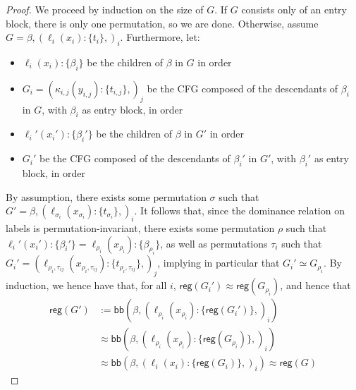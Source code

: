 \documentclass[acmsmall,screen,review]{acmart}
\newcommand{\ms}[1]{\ensuremath{\mathsf{#1}}}
\newcommand{\lto}{:}
\newcommand{\wbranch}[3]{#1(#2) \lto \{#3\}}
\newcommand{\teqv}{\approx}
\newcommand{\adddom}[2]{\ms{bb}(#1, #2)}
\newcommand{\toreg}[1]{\ms{reg}(#1)}
\begin{document}
\cfgperminvar*

\label{proof:cfg-perm-invar}

\begin{proof}
  We proceed by induction on the size of $G$. If $G$ consists only of an entry block, there is only
  one permutation, so we are done. Otherwise, assume $G = \beta, (\wbranch{\ell_i}{x_i}{t_i},)_i$.
  Furthermore, let:
  \begin{itemize}
    \item $\wbranch{\ell_i}{x_i}{\beta_i}$ be the children of $\beta$ in $G$ in order
    \item $G_i = (\wbranch{\kappa_{i, j}}{y_{i, j}}{t_{i, j}},)_j$ be the CFG composed of the
    descendants of $\beta_i$ in $G$, with $\beta_i$ as entry block, in order
    \item $\wbranch{\ell_i'}{x_i'}{\beta_i'}$ be the children of $\beta$ in $G'$ in order
    \item $G_i'$ be the CFG composed of the descendants of $\beta_i'$ in $G'$, with $\beta_i'$ as
    entry block, in order
  \end{itemize}
  By assumption, there exists some permutation $\sigma$ such that $G' = \beta,
  (\wbranch{\ell_{\sigma_i}}{x_{\sigma_i}}{t_{\sigma_i}},)_i$. It follows that, since the dominance
  relation on labels is permutation-invariant, there exists some permutation $\rho$ such that
  $\wbranch{\ell_i'}{x_i'}{\beta_i'} = \wbranch{\ell_{\rho_i}}{x_{\rho_i}}{\beta_{\rho_i}}$, as well
  as permutations $\tau_i$ such that $G_i' = (\wbranch{\ell_{\rho_i, \tau_{ij}}}{x_{\rho_i,
  \tau_{ij}}}{t_{\rho_i, \tau_{ij}}},)_j$, implying in particular that $G_i' \simeq G_{\rho_i}$. By
  induction, we hence have that, for all $i$, $\toreg{G_i'} \teqv \toreg{G_{\rho_i}}$, and hence
  that
  \begin{equation}
    \begin{aligned}
    \toreg{G'} &:= \adddom{\beta}{(\wbranch{\ell_{\rho_i}}{x_{\rho_i}}{\toreg{G_i'}},)_i} \\
    &\teqv \adddom{\beta}{(\wbranch{\ell_{\rho_i}}{x_{\rho_i}}{\toreg{G_{\rho_i}}},)_i} \\
    &\teqv \adddom{\beta}{(\wbranch{\ell_i}{x_i}{\toreg{G_i}},)_i} \teqv \toreg{G}
    \end{aligned}
  \end{equation}
\end{proof}

\cfgconversion*

\label{proof:cfg-conversion}
\end{document}
